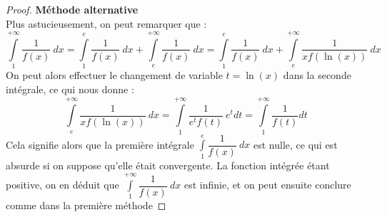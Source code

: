 \begin{proof}
\textbf{Méthode alternative}\\
Plus astucieusement, on peut remarquer que :
\[
\displaystyle\int\limits_{1}^{+\infty} \dfrac{1}{f(x)} \: d x 
= \displaystyle\int\limits_{1}^{e} \dfrac{1}{f(x)} \: d x + \displaystyle\int\limits_{e}^{+\infty} \dfrac{1}{f(x)} \: d x
= \displaystyle\int\limits_{1}^{e} \dfrac{1}{f(x)} \: d x + \displaystyle\int\limits_{e}^{+\infty} \dfrac{1}{x f(\ln(x))} \: d x
\]
On peut alors effectuer le changement de variable $t = \ln(x)$ dans la seconde intégrale, ce qui nous donne :
\[
\displaystyle\int\limits_{e}^{+\infty} \dfrac{1}{x f(\ln(x))} \: d x = \displaystyle\int\limits_{1}^{+\infty} \dfrac{1}{e^t f(t)} \: e^t d t = \displaystyle\int\limits_{1}^{+\infty} \dfrac{1}{f(t)} d t
\]
Cela signifie alors que la première intégrale $\displaystyle\int\limits_{1}^{e} \dfrac{1}{f(x)} \: d x$ est nulle, ce qui est absurde si on suppose qu'elle était convergente. La fonction intégrée étant positive, on en déduit que $\displaystyle\int\limits_{1}^{+\infty} \dfrac{1}{f(x)} \: d x$ est infinie, et on peut ensuite conclure comme dans la première méthode
\end{proof}